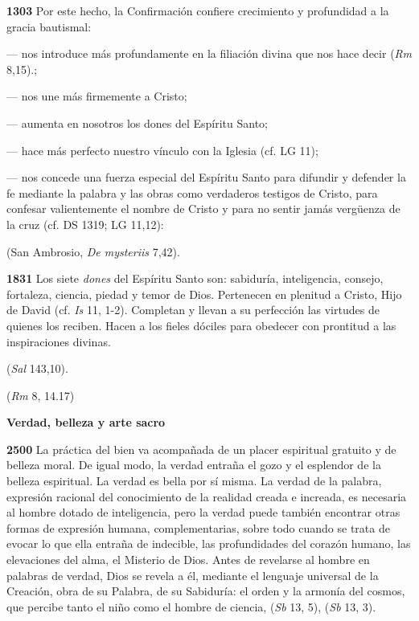 \textbf{1303} Por este hecho, la Confirmación confiere crecimiento y profundidad a la gracia bautismal:

--- nos introduce más profundamente en la filiación divina que nos hace decir  (\emph{Rm} 8,15).;

--- nos une más firmemente a Cristo;

--- aumenta en nosotros los dones del Espíritu Santo;

--- hace más perfecto nuestro vínculo con la Iglesia (cf. LG 11);

--- nos concede una fuerza especial del Espíritu Santo para difundir y defender la fe mediante la palabra y las obras como verdaderos testigos de Cristo, para confesar valientemente el nombre de Cristo y para no sentir jamás vergüenza de la cruz (cf. DS 1319; LG 11,12):

 (San Ambrosio, \emph{De mysteriis} 7,42).

\textbf{1831} Los siete \emph{dones} del Espíritu Santo son: sabiduría, inteligencia, consejo, fortaleza, ciencia, piedad y temor de Dios. Pertenecen en plenitud a Cristo, Hijo de David (cf. \emph{Is} 11, 1-2). Completan y llevan a su perfección las virtudes de quienes los reciben. Hacen a los fieles dóciles para obedecer con prontitud a las inspiraciones divinas.

 (\emph{Sal} 143,10).

 (\emph{Rm} 8, 14.17)

\textbf{Verdad, belleza y arte sacro}

\textbf{2500} La práctica del bien va acompañada de un placer espiritual gratuito y de belleza moral. De igual modo, la verdad entraña el gozo y el esplendor de la belleza espiritual. La verdad es bella por sí misma. La verdad de la palabra, expresión racional del conocimiento de la realidad creada e increada, es necesaria al hombre dotado de inteligencia, pero la verdad puede también encontrar otras formas de expresión humana, complementarias, sobre todo cuando se trata de evocar lo que ella entraña de indecible, las profundidades del corazón humano, las elevaciones del alma, el Misterio de Dios. Antes de revelarse al hombre en palabras de verdad, Dios se revela a él, mediante el lenguaje universal de la Creación, obra de su Palabra, de su Sabiduría: el orden y la armonía del cosmos, que percibe tanto el niño como el hombre de ciencia,  (\emph{Sb} 13, 5),  (\emph{Sb} 13, 3).

